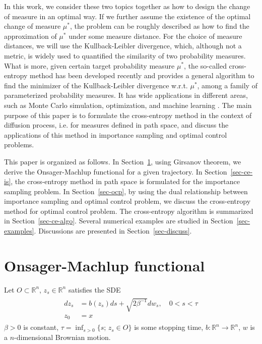 \documentclass[final]{siamltex}
\begin{document}
In this work, we consider these two topics together as how to design the change of
measure in an optimal way. If we further assume the existence of the optimal
change of measure $\mu^*$, the problem can be roughly described as how to find the approximation of
$\mu^*$ under some measure distance. For the choice of measure distances, we will use the Kullback-Leibler
divergence, which, although not a metric, is
widely used to quantified the similarity of two probability measures. 
What is more, given certain target probability measure $\mu^*$, the so-called cross-entropy method has been
developed recently and provides a general algorithm to find the minimizer of the
Kullback-Leibler divergence w.r.t. $\mu^*$, among a family of parameterized
probability measures. It has wide applications in different areas, such as
Monte Carlo simulation, optimization, and machine learning \cite{ce_tutorial, ce_book}. The
main purpose of this paper is to formulate the cross-entropy method in the
context of diffusion process, i.e. for measures defined in path space, and
discuss the applications of this method in importance sampling and optimal control
problems.

This paper is organized as follows. In Section~\ref{sec-om-functional},
using Girsanov theorem, we derive the Onsager-Machlup functional for a given trajectory.
In Section~\ref{sec-ce-is}, the cross-entropy method in path space is
formulated for the importance sampling problem.
In Section~\ref{sec-ocp}, by using the dual relationship between importance
sampling and optimal control problem, we discuss the cross-entropy method for
optimal control problem. The cross-entropy algorithm is summarized in
Section~\ref{sec-ce-algo}. Several numerical examples are studied in
Section~\ref{sec-examples}. Discussions are presented in
Section~\ref{sec-discuss}.


\section{Onsager-Machlup functional}
\label{sec-om-functional}
Let $O \subset \mathbb{R}^n$, $z_s \in \mathbb{R}^n$ satisfies the SDE 
\begin{align}
\begin{split}
  d z_s &= b(z_s) ds + \sqrt{2\beta^{-1}} dw_s, \quad 0 < s < \tau  \\
  z_0&=x
  \end{split}
\label{dynamics-1}
\end{align}
$\beta >0$ is constant, $\tau = \inf_{s>0} \{s;\, z_s \in O\}$ is some
stopping time, $b : \mathbb{R}^n \rightarrow \mathbb{R}^n$, $w$ is a
$n$-dimensional Brownian motion. 
\end{document}
